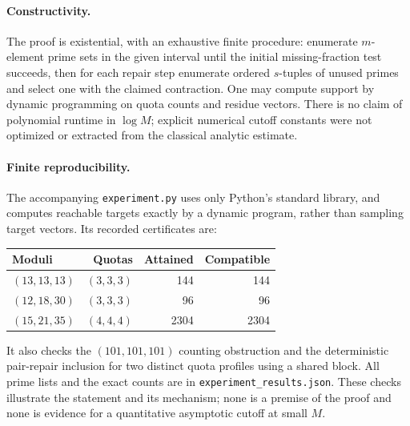 \documentclass[11pt]{article}
\theoremstyle{definition}\newtheorem{remark}[theorem]{Remark}
\begin{document}
\paragraph{Constructivity.} The proof is existential, with an exhaustive finite procedure: enumerate $m$-element prime sets in the given interval until the initial missing-fraction test succeeds, then for each repair step enumerate ordered $s$-tuples of unused primes and select one with the claimed contraction. One may compute support by dynamic programming on quota counts and residue vectors. There is no claim of polynomial runtime in $\log M$; explicit numerical cutoff constants were not optimized or extracted from the classical analytic estimate.

\paragraph{Finite reproducibility.} The accompanying \texttt{experiment.py} uses only Python's standard library, and computes reachable targets exactly by a dynamic program, rather than sampling target vectors. Its recorded certificates are:
\begin{center}
\begin{tabular}{@{}lrrr@{}}\toprule
Moduli & Quotas & Attained & Compatible\\\midrule
$(13,13,13)$ & $(3,3,3)$ & 144 & 144\\
$(12,18,30)$ & $(3,3,3)$ & 96 & 96\\
$(15,21,35)$ & $(4,4,4)$ & 2304 & 2304\\\bottomrule
\end{tabular}
\end{center}
It also checks the $(101,101,101)$ counting obstruction and the deterministic pair-repair inclusion for two distinct quota profiles using a shared block. All prime lists and the exact counts are in \texttt{experiment\_results.json}. These checks illustrate the statement and its mechanism; none is a premise of the proof and none is evidence for a quantitative asymptotic cutoff at small $M$.
\end{document}
